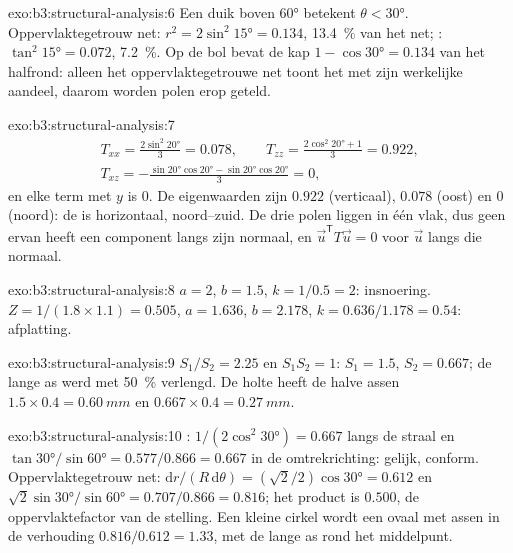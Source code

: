 \begin{solution}{exo:b3:structural-analysis:6}
Een duik boven \ang{60} betekent $\theta < \ang{30}$. Oppervlaktegetrouw net: $r^2 =
2\sin^2\ang{15} = 0.134$, \qty{13.4}{\percent} van het net; :
$\tan^2\ang{15} = 0.072$, \qty{7.2}{\percent}. Op de bol bevat de kap
$1 - \cos\ang{30} = 0.134$ van het halfrond: alleen het oppervlaktegetrouwe net toont
het met zijn werkelijke aandeel, daarom worden polen erop geteld.
\end{solution}

\begin{solution}{exo:b3:structural-analysis:7}
\begin{gather*}
  T_{xx} = \frac{2\sin^2\ang{20}}3 = 0.078,\qquad
  T_{zz} = \frac{2\cos^2\ang{20} + 1}3 = 0.922,\\
  T_{xz} = -\frac{\sin\ang{20}\cos\ang{20} - \sin\ang{20}\cos\ang{20}}3 = 0,
\end{gather*}
en elke term met $y$ is 0. De eigenwaarden zijn $0.922$ (verticaal),
$0.078$ (oost) en $0$ (noord): de  is horizontaal, noord--zuid.
De drie polen liggen in één vlak, dus geen ervan heeft een component langs zijn normaal,
en $\vec u^{\mathsf T}T\vec u = 0$ voor $\vec u$ langs die normaal.
\end{solution}

\begin{solution}{exo:b3:structural-analysis:8}
$a = 2$, $b = 1.5$, $k = 1/0.5 = 2$: insnoering. $Z = 1/(1.8\times1.1) =
0.505$, $a = 1.636$, $b = 2.178$, $k = 0.636/1.178 = 0.54$: afplatting.
\end{solution}

\begin{solution}{exo:b3:structural-analysis:9}
$S_1/S_2 = 2.25$ en $S_1S_2 = 1$: $S_1 = 1.5$, $S_2 = 0.667$; de lange as
werd met \qty{50}{\percent} verlengd. De holte heeft de halve assen $1.5\times0.4 =
\qty{0.60}{mm}$ en $0.667\times0.4 = \qty{0.27}{mm}$.
\end{solution}

\begin{solution}{exo:b3:structural-analysis:10}
: $1/(2\cos^2\ang{30}) = 0.667$ langs de straal en
$\tan\ang{30}/\sin\ang{60} = 0.577/0.866 = 0.667$ in de omtrekrichting: gelijk, conform.
Oppervlaktegetrouw net: $\mathrm dr/(R\,\mathrm d\theta) = (\sqrt2/2)\cos\ang{30} = 0.612$
en $\sqrt2\sin\ang{30}/\sin\ang{60} = 0.707/0.866 = 0.816$; het product is
$0.500$, de oppervlaktefactor van de stelling. Een kleine cirkel wordt een ovaal met assen
in de verhouding $0.816/0.612 = 1.33$, met de lange as rond het middelpunt.
\end{solution}

